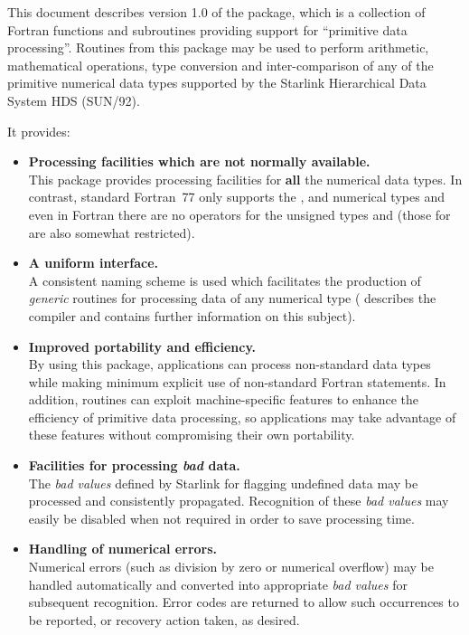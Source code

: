 This document describes version 1.0 of the  package, which
is a collection of Fortran functions and subroutines providing support for
``primitive data processing''.
Routines from this package may be used to perform arithmetic, mathematical
operations, type conversion and inter-comparison of any of the primitive
numerical data types supported by the Starlink Hierarchical Data System HDS
(SUN/92).

It provides:

\begin{itemize}

\item {\bf Processing facilities which are not normally available.}\\
This package provides processing facilities for {\bf all} the numerical
 data types.  In contrast, standard Fortran~77 only supports the
,  and  numerical types  and
even in  Fortran there are no operators for the unsigned types
 and  (those for  are also
somewhat restricted).

\item {\bf A uniform interface.}\\
A consistent naming scheme is used which facilitates the production of {\em
generic} routines for processing data of any numerical type (
describes the  compiler and contains further information on
this subject).

\item {\bf Improved portability and efficiency.}\\
By using this package, applications can process non-standard data types
while making minimum explicit use of non-standard Fortran statements.
In addition,  routines can exploit machine-specific features
to enhance the efficiency of primitive data processing, so applications may
take advantage of these features without compromising their own portability.

\item {\bf Facilities for processing {\em bad} data.}\\
The {\em bad values} defined by Starlink for flagging undefined data
may be processed and consistently propagated.
Recognition of these {\em bad values} may easily be disabled when not
required in order to save processing time.

\item {\bf Handling of numerical errors.}\\
Numerical errors (such as division by zero or numerical overflow) may be
handled automatically and converted into appropriate {\em bad values} for
subsequent recognition.
Error codes are returned to allow such occurrences to be reported, or
recovery action taken, as desired.


\end{itemize}
